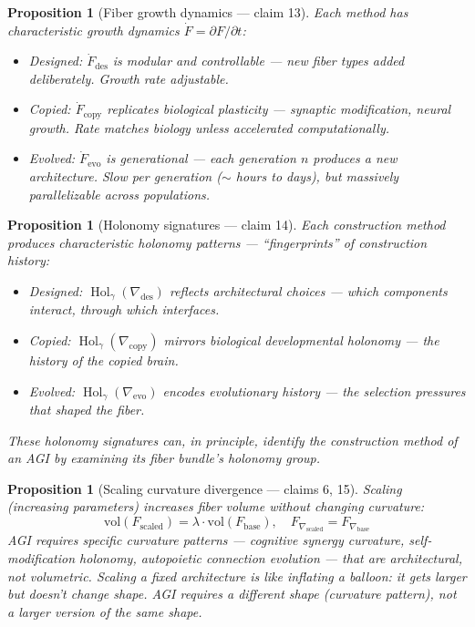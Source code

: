 \documentclass[11pt,a4paper]{article}
\newtheorem{proposition}[definition]{Proposition}
\begin{document}
\begin{proposition}[Fiber growth dynamics --- claim 13]
\label{prop:growth}
Each method has characteristic growth dynamics $\dot{F} = \partial F / \partial t$:
\begin{itemize}
  \item Designed: $\dot{F}_{\text{des}}$ is modular and controllable ---
    new fiber types added deliberately. Growth rate adjustable.
  \item Copied: $\dot{F}_{\text{copy}}$ replicates biological plasticity ---
    synaptic modification, neural growth. Rate matches biology unless
    accelerated computationally.
  \item Evolved: $\dot{F}_{\text{evo}}$ is generational --- each generation
    $n$ produces a new architecture. Slow per generation ($\sim$ hours to
    days), but massively parallelizable across populations.
\end{itemize}
\end{proposition}

\begin{proposition}[Holonomy signatures --- claim 14]
\label{prop:holonomy}
Each construction method produces characteristic holonomy patterns ---
``fingerprints'' of construction history:
\begin{itemize}
  \item Designed: $\operatorname{Hol}_\gamma(\nabla_{\text{des}})$ reflects
    architectural choices --- which components interact, through which
    interfaces.
  \item Copied: $\operatorname{Hol}_\gamma(\nabla_{\text{copy}})$ mirrors
    biological developmental holonomy --- the history of the copied brain.
  \item Evolved: $\operatorname{Hol}_\gamma(\nabla_{\text{evo}})$ encodes
    evolutionary history --- the selection pressures that shaped the fiber.
\end{itemize}
These holonomy signatures can, in principle, identify the construction
method of an AGI by examining its fiber bundle's holonomy group.
\end{proposition}

\begin{proposition}[Scaling curvature divergence --- claims 6, 15]
\label{prop:scaling}
Scaling (increasing parameters) increases fiber volume without changing
curvature:
\[
  \text{vol}(F_{\text{scaled}}) = \lambda \cdot \text{vol}(F_{\text{base}}),
  \quad F_{\nabla_{\text{scaled}}} = F_{\nabla_{\text{base}}}
\]
AGI requires specific curvature patterns --- cognitive synergy curvature,
self-modification holonomy, autopoietic connection evolution --- that are
\emph{architectural}, not \emph{volumetric}. Scaling a fixed architecture
is like inflating a balloon: it gets larger but doesn't change shape.
AGI requires a different shape (curvature pattern), not a larger version
of the same shape.
\end{proposition}
\end{document}
